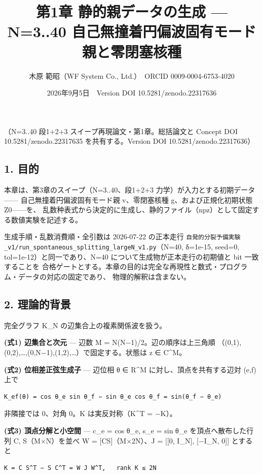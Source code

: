 \documentclass[
  a4paper,
]{ltjsarticle}
\title{第1章 静的親データの生成 --- N=3..40
自己無撞着円偏波固有モード親と零閉塞核種}
\author{木原 範昭（WF System Co., Ltd.）　ORCID 0009-0004-6753-4020}
\date{2026年9月5日　Version DOI 10.5281/zenodo.22317636}
\begin{document}
\maketitle

（N=3..40 段1+2+3 スイープ再現論文・第1章。総括論文と Concept DOI
10.5281/zenodo.22317635 を共有する。Version DOI
10.5281/zenodo.22317636）

\subsection{1. 目的}\label{ux76eeux7684}

本章は、第3章のスイープ（N=3..40、段1+2+3
力学）が入力とする初期データ------ 自己無撞着円偏波固有モード親
v、零閉塞核種 g、および正規化初期状態 Z0------を、
乱数种表式から決定的に生成し、静的ファイル（npz）として固定する数値実験を記述する。

生成手順・乱数消費順・全引数は 2026-07-22 の正本走行
\texttt{自発的分裂予備実験\_v1/run\_spontaneous\_splitting\_largeN\_v1.py}（N=40,
δ=1e-15, seed=0, tol=1e-12）と同一であり、N=40
について生成物が正本走行の初期値と bit 一致することを
合格ゲートとする。本章の目的は完全な再現性と数式・プログラム・データの対応の固定であり、
物理的解釈は含まない。

\subsection{2. 理論的背景}\label{ux7406ux8ad6ux7684ux80ccux666f}

完全グラフ K\_N の辺集合上の複素関係波を扱う。

\textbf{(式1) 辺集合と次元} --- 辺数 M = N(N−1)/2。辺の順序は上三角順
（(0,1),(0,2),\ldots,(0,N−1),(1,2),\ldots）で固定する。状態は z ∈
C\^{}M。

\textbf{(式2) 位相差正弦生成子} --- 辺位相 θ ∈ R\^{}M
に対し、頂点を共有する辺対 (e,f) 上で

\begin{verbatim}
K_ef(θ) = cos θ_e sin θ_f − sin θ_e cos θ_f = sin(θ_f − θ_e)
\end{verbatim}

非隣接では 0、対角 0。K は実反対称（K\^{}T = −K）。

\textbf{(式3) 頂点分解と小空間} --- c\_e = cos θ\_e, s\_e = sin θ\_e
を頂点へ散布した行列 C, S（M×N）を並べ W = {[}C\textbar S{]}（M×2N）、J
= {[}{[}0, I\_N{]}, {[}−I\_N, 0{]}{]} とすると

\begin{verbatim}
K = C S^T − S C^T = W J W^T,   rank K ≤ 2N
\end{verbatim}
\end{document}
